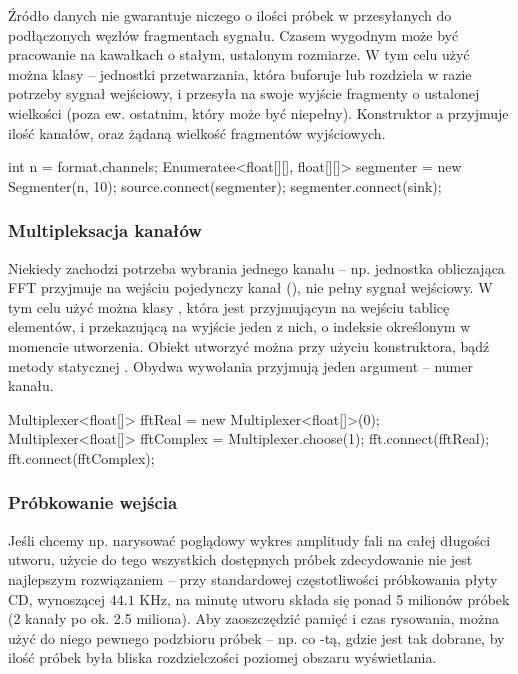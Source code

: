 Źródło danych nie gwarantuje niczego o ilości próbek w przesyłanych do podłączonych węzłów
fragmentach sygnału. Czasem wygodnym może być pracowanie na kawałkach o stałym, ustalonym rozmiarze.
W tym celu użyć można klasy  -- jednostki przetwarzania, która buforuje lub
rozdziela w razie potrzeby sygnał wejściowy, i przesyła na swoje wyjście fragmenty o ustalonej
wielkości (poza ew. ostatnim, który może być niepełny). Konstruktor a przyjmuje
ilość kanałów, oraz żądaną wielkość fragmentów wyjściowych.

\begin{java}
int n = format.channels;
Enumeratee<float[][], float[][]> segmenter = new Segmenter(n, 10);
source.connect(segmenter);
segmenter.connect(sink);
\end{java}

\subsubsection{Multipleksacja kanałów}

Niekiedy zachodzi potrzeba wybrania jednego kanału -- np. jednostka obliczająca FFT przyjmuje na
wejściu pojedynczy kanał (), nie pełny sygnał wejściowy. W tym celu użyć można klasy
, która jest  przyjmującym na wejściu tablicę elementów, i
przekazującą na wyjście jeden z nich, o indeksie określonym w momencie utworzenia. Obiekt
 utworzyć można przy użyciu konstruktora, bądź metody statycznej .
Obydwa wywołania przyjmują jeden argument -- numer kanału.

\begin{java}
Multiplexer<float[]> fftReal = new Multiplexer<float[]>(0);
Multiplexer<float[]> fftComplex = Multiplexer.choose(1);
fft.connect(fftReal);
fft.connect(fftComplex);
\end{java}

\subsubsection{Próbkowanie wejścia}

Jeśli chcemy np. narysować poglądowy wykres amplitudy fali na całej długości utworu, użycie do tego
wszystkich dostępnych próbek zdecydowanie nie jest najlepszym rozwiązaniem -- przy standardowej
częstotliwości próbkowania płyty CD, wynoszącej $44.1$ KHz, na minutę utworu składa się ponad 5
milionów próbek (2 kanały po ok. 2.5 miliona). Aby zaoszczędzić pamięć i czas rysowania, można użyć
do niego pewnego podzbioru próbek -- np. co -tą, gdzie  jest tak dobrane, by ilość
próbek była bliska rozdzielczości poziomej obszaru wyświetlania.

